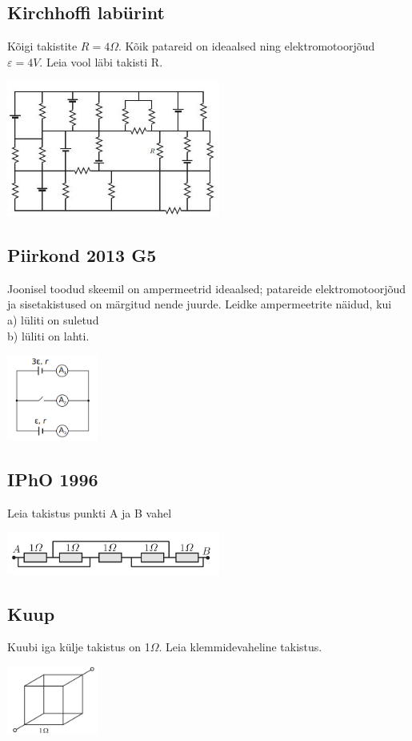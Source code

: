 \documentclass{article}
\begin{document}
\subsection{Kirchhoffi labürint}
Kõigi takistite $R=4\Omega$. Kõik patareid on ideaalsed ning elektromotoorjõud $\varepsilon = 4V$. Leia vool läbi takisti R.
\begin{center}
\includegraphics[width =  7cm]{ec2.jpg}
\end{center}
\subsection{Piirkond 2013 G5}
Joonisel toodud skeemil on ampermeetrid ideaalsed; patareide elektromotoorjõud ja sisetakistused on märgitud nende juurde. Leidke ampermeetrite näidud, kui\\
a) lüliti on suletud\\
b) lüliti on lahti.
\begin{center}
\includegraphics[width =  3cm]{ec12.PNG}
\end{center}
\subsection{IPhO 1996}
Leia takistus punkti A ja B vahel
\begin{center}
\includegraphics[width =  7cm]{ec5.PNG}
\end{center}
\subsection{Kuup}
Kuubi iga külje takistus on 1$\Omega$. Leia klemmidevaheline takistus.
\begin{center}
\includegraphics[width =  3cm]{ec10.PNG}
\end{center}
\end{document}
